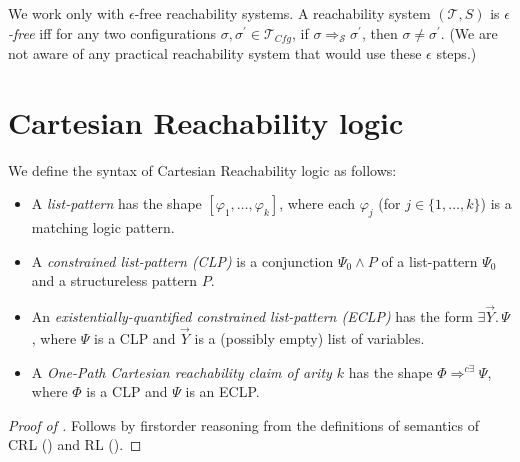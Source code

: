 \begin{definition}
\end{definition}

\begin{remark}\label{rem:noEmptySteps}
    We work only with $\epsilon$-free reachability systems.
    A reachability system $(\mathcal{T}, S)$ is \emph{$\epsilon$-free}
    iff for any two configurations $\sigma, \sigma^\prime \in \mathcal{T}_{\mathit{Cfg}}$, if
    $\sigma \Rightarrow_{\mathcal{S}} \sigma^\prime$, then $\sigma \not = \sigma^\prime$.
    (We are not aware of any practical reachability system that would use these $\epsilon$ steps.)
\end{remark}
  

\section{Cartesian Reachability logic}\label{app:CRL}

\begin{definition}\label{def:opCRLSyntax}
    We define the syntax of Cartesian Reachability logic as follows:
    \begin{itemize}
        \item 
    A \emph{list-pattern} has the shape $[\varphi_1,\ldots,\varphi_k]$,
              where each $\varphi_j$ (for $j \in \{ 1, \ldots, k \} $) is a matching logic pattern.
        \item
              A \emph{constrained list-pattern (CLP)} is a conjunction $\Psi_0 \land P$
              of a list-pattern $\Psi_0$ and a structureless pattern $P$.
        \item
              An \emph{existentially-quantified constrained list-pattern (ECLP)} has the form
              $\exists \vec{Y}.\, \Psi$, where $\Psi$ is a CLP and $\vec{Y}$ is a (possibly empty) list of variables.
        \item
              A \emph{One-Path Cartesian reachability claim of arity $k$} has the shape
              $\Phi \Rightarrow^{c\exists} \Psi$,
              where $\Phi$ is a CLP and $\Psi$ is an ECLP.
    \end{itemize}
\end{definition}    

\begin{proof}[Proof of ]
    Follows by firstorder reasoning from the definitions of semantics of CRL () and RL
    ().
\end{proof}

